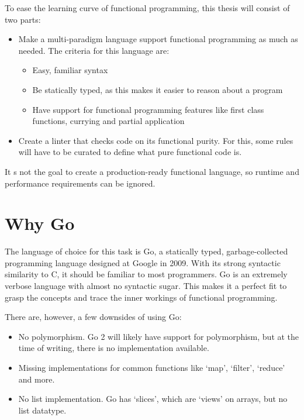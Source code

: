 To ease the learning curve of functional programming, this thesis will consist of two parts:

\begin{itemize}
    \item Make a multi-paradigm language support functional programming as much as needed.
        The criteria for this language are:
    \begin{itemize}
        \item Easy, familiar syntax
        \item Be statically typed, as this makes it easier to reason about a program
        \item Have support for functional programming features like first class functions, currying
            and partial application
    \end{itemize}
    \item Create a linter that checks code on its functional purity. For this, some rules will have
        to be curated to define what pure functional code is.
\end{itemize}

It s not the goal to create a production-ready functional language, so runtime and performance requirements
can be ignored.

\section{Why Go}

The language of choice for this task is Go, a statically typed, garbage-collected programming language
designed at Google in 2009\autocite{golang-publish}. With its strong syntactic similarity to C, it should
be familiar to most programmers.
Go is an extremely verbose language with almost no syntactic sugar. This makes it a perfect fit to
grasp the concepts and trace the inner workings of functional programming.

There are, however, a few downsides of using Go:

\begin{itemize}
    \item No polymorphism. Go 2 will likely have support for polymorphism, but at the time of writing,
        there is no implementation available.
    \item Missing implementations for common functions like `map', `filter', `reduce' and more.
    \item No list implementation. Go has `slices', which are `views' on arrays, but
        no list datatype.
\end{itemize}

